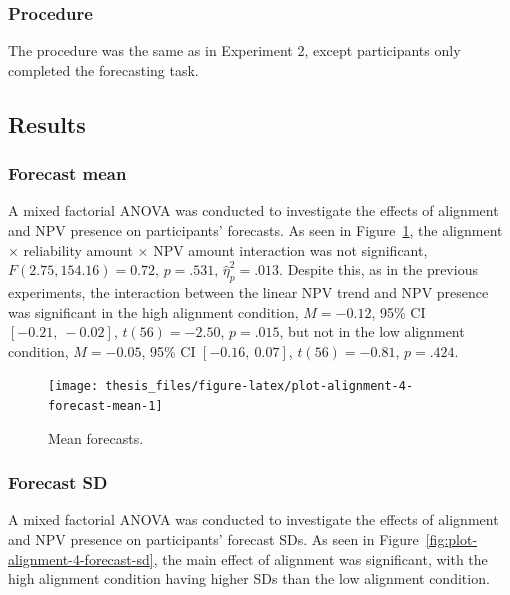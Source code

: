 \documentclass[a4paper, nobind, dvipsnames]{templates/ociamthesis}
\theoremstyle{definition}
\theoremstyle{definition}
\theoremstyle{definition}
\theoremstyle{definition}
\theoremstyle{remark}
\begin{document}
\hypertarget{procedure-9}{%
\subsubsection{Procedure}\label{procedure-9}}

The procedure was the same as in Experiment 2, except participants only
completed the forecasting task.

\hypertarget{results-7}{%
\subsection{Results}\label{results-7}}

\hypertarget{forecast-mean-1}{%
\subsubsection{Forecast mean}\label{forecast-mean-1}}

A mixed factorial ANOVA was conducted to investigate the effects of alignment
and NPV presence on participants' forecasts. As seen in
Figure~\ref{fig:plot-alignment-4-forecast-mean}, the alignment \(\times\)
reliability amount \(\times\) NPV amount interaction was not significant,
\(F(2.75, 154.16) = 0.72\), \(p = .531\), \(\hat{\eta}^2_p = .013\).
Despite this, as in the previous experiments, the interaction between the linear
NPV trend and NPV presence was significant in the high alignment condition,
\(M = -0.12\), 95\% CI \([-0.21,~-0.02]\), \(t(56) = -2.50\), \(p = .015\), but not in the
low alignment condition,
\(M = -0.05\), 95\% CI \([-0.16,~0.07]\), \(t(56) = -0.81\), \(p = .424\).



\begin{figure}
\texttt{[image: thesis\_files/figure-latex/plot-alignment-4-forecast-mean-1]} \caption{Mean forecasts.}\label{fig:plot-alignment-4-forecast-mean}
\end{figure}

\hypertarget{forecast-sd-alignment-4}{%
\subsubsection{Forecast SD}\label{forecast-sd-alignment-4}}

A mixed factorial ANOVA was conducted to investigate the effects of alignment
and NPV presence on participants' forecast SDs. As seen in
Figure~\ref{fig:plot-alignment-4-forecast-sd}, the main effect of alignment was
significant, with the high alignment condition having higher SDs than the low
alignment condition.
\end{document}
